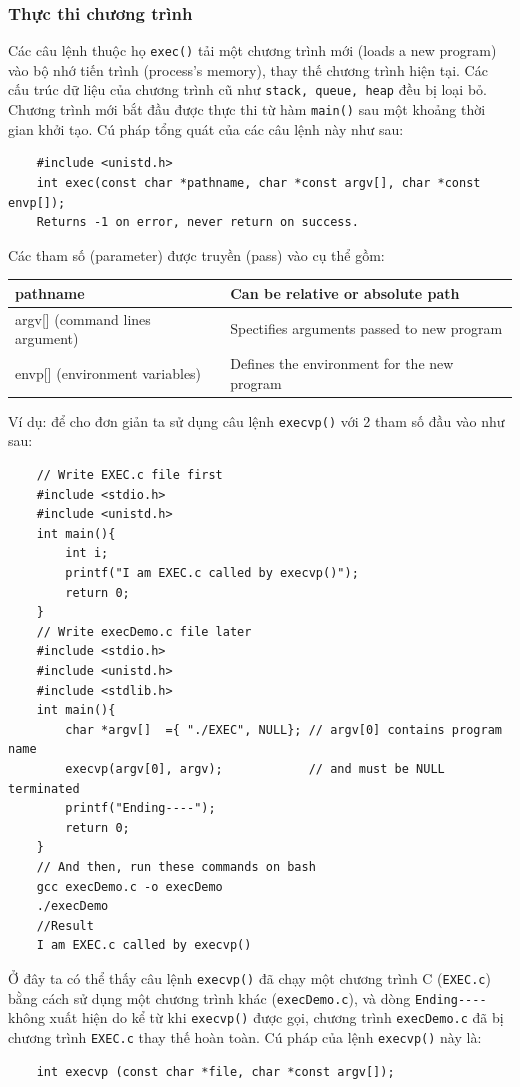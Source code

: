 \documentclass{article}
\begin{document}
\subsubsection{Thực thi chương trình}
Các câu lệnh thuộc họ \verb|exec()| tải một chương trình mới (loads a new program) vào bộ nhớ tiến trình (process's memory), thay thế chương trình hiện tại.
Các cấu trúc dữ liệu của chương trình cũ như \verb|stack, queue, heap| đều bị loại bỏ. Chương trình mới bắt đầu được thực thi từ hàm \verb|main()| sau một khoảng thời gian khởi tạo.
Cú pháp tổng quát của các câu lệnh này như sau:
\begin{verbatim}
    #include <unistd.h>
    int exec(const char *pathname, char *const argv[], char *const envp[]);
    Returns -1 on error, never return on success.
\end{verbatim}
Các tham số (parameter) được truyền (pass) vào cụ thể gồm:
\begin{center}
    \begin{tabular}{ | l |l| } 
      \hline
      pathname & Can be relative or absolute path \\ 
      \hline
      argv[] (command lines argument) & Spectifies arguments passed to new program  \\ 
      \hline
      envp[] (environment variables) & Defines the environment for the new program \\ 
      \hline
    \end{tabular}
    \end{center}
Ví dụ: để cho đơn giản ta sử dụng câu lệnh \verb|execvp()| với 2 tham số đầu vào như sau:
\begin{verbatim}
    // Write EXEC.c file first
    #include <stdio.h>
    #include <unistd.h>
    int main(){
        int i;
        printf("I am EXEC.c called by execvp()");
        return 0;
    }
    // Write execDemo.c file later
    #include <stdio.h>
    #include <unistd.h>
    #include <stdlib.h>
    int main(){
        char *argv[]  ={ "./EXEC", NULL}; // argv[0] contains program name 
        execvp(argv[0], argv);            // and must be NULL terminated
        printf("Ending----");
        return 0;
    } 
    // And then, run these commands on bash
    gcc execDemo.c -o execDemo
    ./execDemo
    //Result
    I am EXEC.c called by execvp()
\end{verbatim}
Ở đây ta có thể thấy câu lệnh \verb|execvp()| đã chạy một chương trình C (\verb|EXEC.c|) bằng cách sử dụng một chương trình khác (\verb|execDemo.c|),
và dòng \verb|Ending----| không xuất hiện do kể từ khi \verb|execvp()| được gọi, chương trình \verb|execDemo.c| đã bị 
chương trình \verb|EXEC.c| thay thế hoàn toàn. Cú pháp của lệnh \verb|execvp()| này là:
\begin{verbatim}
    int execvp (const char *file, char *const argv[]);
\end{verbatim}
\end{document}
